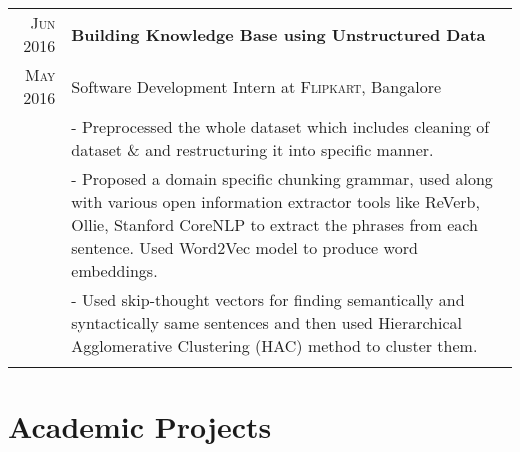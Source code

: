 \documentclass[a4paper,10pt]{extarticle} %
\begin{document}
\begin{tabular}{r|p{16cm}}

\textsc{\normalsize{Jun 2016}} & \textbf{\normalsize{Building Knowledge Base using Unstructured Data}}\\
\textsc{\normalsize{May 2016}} & \small{Software Development Intern at} \textsc{Flipkart}\small{, Bangalore}\\

& \footnotesize{- Preprocessed the whole dataset which includes cleaning of dataset \& and restructuring it into specific manner.}\\
& \footnotesize{- Proposed a domain specific chunking grammar, used along with various open information extractor tools like ReVerb, Ollie, Stanford CoreNLP to extract the phrases from each sentence. Used Word2Vec model to produce word embeddings.}\\
& \footnotesize{- Used skip-thought vectors for finding semantically and syntactically same sentences and then used Hierarchical Agglomerative Clustering (HAC) method to cluster them.}\\
\multicolumn{2}{c}{} \\
\end{tabular}


\section{\large{Academic Projects}}
\end{document}

